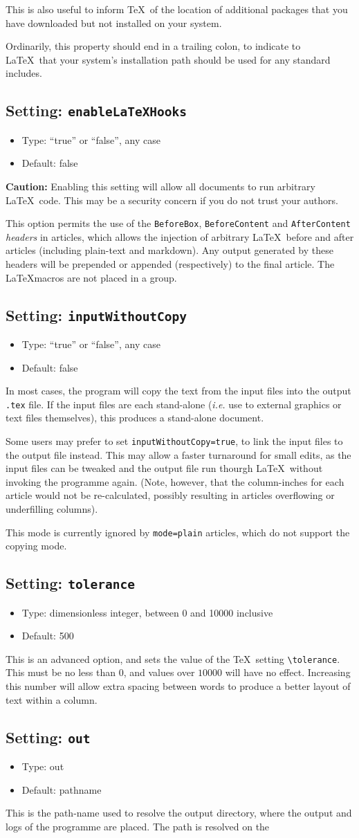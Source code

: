 \documentclass[a4paper,DIV=11]{scrartcl}
\newcommand{\property}[5]{
  \subsection{#1: \texttt{#2}}
  \begin{itemize}
  \item Type: #3
  \item Default: #4
  \end{itemize}
  #5
}
\newcommand{\setting}{\property{Setting}}
\begin{document}
\begin{multicols}{2}
{  This is also useful to inform \TeX\ of the location of additional
  packages that you have downloaded but not installed on your system.\par
  Ordinarily, this property should end in a trailing colon, to
  indicate to \LaTeX\ that your system's installation path should be
  used for any standard includes.\par
}
\setting{enableLaTeXHooks}{``true'' or ``false'', any case}{false}{
  \textbf{Caution:} Enabling this setting will allow all documents to
  run arbitrary \LaTeX\ code. This may be a security concern if you do
  not trust your authors.\par
  This option permits the use of the \texttt{BeforeBox}, \texttt{BeforeContent} and
  \texttt{AfterContent} \textit{headers} in articles, which allows the
  injection of arbitrary \LaTeX\ before and after articles (including
  plain-text and markdown). Any output generated by these headers will
  be prepended or appended (respectively) to the final article. The
  \LaTeX macros are not placed in a group.
}
\setting{inputWithoutCopy}{``true'' or ``false'', any case}{false}{
  In most cases, the program will copy the text from the input files
  into the output \texttt{.tex} file. If the input files are each
  stand-alone (\textit{i.e.} use to external graphics or text files
  themselves), this produces a stand-alone document. \par
  Some users may prefer to set \texttt{inputWithoutCopy=true}, to link
  the input files to the output file instead. This may allow a faster
  turnaround for small edits, as the input files can be tweaked and
  the output file run thourgh \LaTeX\ without invoking the programme
  again. (Note, however, that the column-inches for each article would
  not be re-calculated, possibly resulting in articles overflowing or
  underfilling columns).\par
  This mode is currently ignored by \texttt{mode=plain} articles,
  which do not support the copying mode.
}
\setting{tolerance}{dimensionless integer, between 0 and 10000 inclusive}{500}{
  This is an advanced option, and sets the value of the \TeX\ setting
  \texttt{\textbackslash tolerance}. This must be no less than $0$,
  and values over $10000$ will have no effect. Increasing this number
  will allow extra spacing between words to produce a better layout of
  text within a column.}  \setting{out}{out}{pathname}{This is the
  path-name used to resolve the output directory, where the output and
  logs of the programme are placed. The path is resolved on the
}
\end{multicols}
\end{document}
